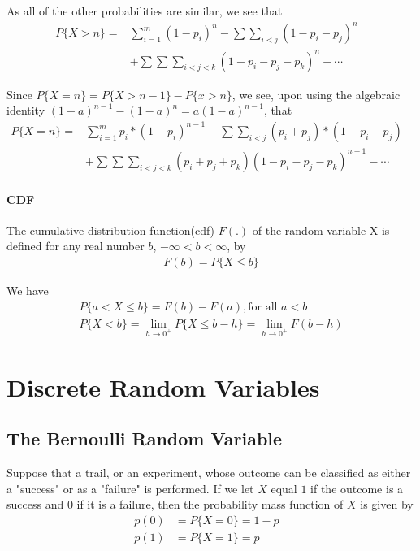 \documentclass[10 pt,final]{article}
\newcommand{\impo}[1]{{\color{magenta} #1}}
\begin{document}
As all of the other probabilities are similar, we see that
\begin{align*}
P\{X > n\} = & \sum^m_{i=1} (1-p_i)^n - \sum \sum_{i < j} (1- p_i - p_j)^n & \\
& + \sum \sum \sum_{i<j<k} (1-p_i-p_j-p_k)^n - \cdots &
\end{align*}

Since \impo{$P\{X=n\} = P\{X > n-1\} - P\{x>n\}$}, we see, upon using the algebraic identity \impo{$(1-a)^{n-1} - (1-a)^n = a(1-a)^{n-1}$}, that 
\begin{align*}
P\{X=n\} = & \sum^m_{i=1} p_i*(1-p_i)^{n-1} - \sum \sum_{i<j}(p_i + p_j)*(1-p_i-p_j) & \\
& +\sum \sum \sum_{i<j<k} (p_i + p_j + p_k)(1-p_i - p_j -p_k)^{n-1} -\cdots &
\end{align*}

\paragraph{CDF} The cumulative distribution function(cdf) $F(.)$ of the random variable X is defined for any real number $b$, $-\infty         < b < \infty $, by 
\begin{align*}
F(b) = P\{X \leq b\}
\end{align*}

We have 
\begin{align*}
P\{a < X  \leq b\} = F(b) - F(a), \text{for all } a < b \\
P\{X < b \} = \lim_{h \to 0^+} P\{X \leq b - h\} = \lim_{h \to 0^+} F(b-h)
\end{align*}
\section{Discrete Random Variables}
\subsection{The Bernoulli Random Variable}
Suppose that a trail, or an experiment, whose outcome can be classified as either a "success" or as a "failure" is performed. If we let $X$ equal $1$ if the outcome is a success and $0$ if it is a failure, then the probability mass function of $X$ is given by
\begin{align*}
p(0) & = P\{X = 0\} = 1-p & \\
p(1) & = P\{X = 1\} = p &
\end{align*}
\end{document}
